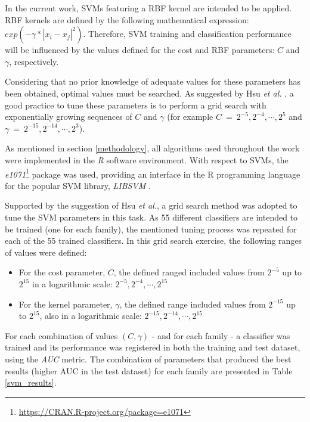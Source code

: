 \documentclass[11pt]{article}
\begin{document}
In the current work, SVMs featuring a RBF kernel are intended to be applied. RBF kernels are defined by the following mathematical expression: $exp(- \gamma * |x_{i}-x_{j}|^2) $. Therefore, SVM training and classification performance will be influenced by the values defined for the cost and RBF parameters: $C$ and $\gamma$, respectively.

Considering that no prior knowledge of adequate values for these parameters has been obtained, optimal values must be searched. As suggested by Hsu \emph{et al.} \cite{hsu2003practical}, a good practice to tune these parameters is to perform a grid search with exponentially growing sequences of $C$ and $\gamma$ (for example $C \: = \: 2^{-5}, 2^{-4}, \cdots , 2^{5}$ and $\gamma \: = \: 2^{-15}, 2^{-14}, \cdots , 2^{3}$).

As mentioned in section \ref{methodology}, all algorithms used throughout the work were implemented in the \emph{R} software environment. With respect to SVMs, the \emph{e1071}\footnote{\url{https://CRAN.R-project.org/package=e1071}} package was used, providing an interface in the R programming language for the popular SVM library, \emph{LIBSVM} \cite{CC01a}.

Supported by the suggestion of Hsu \emph{et al.}, a grid search method was adopted to tune the SVM parameters in this task. As 55 different classifiers are intended to be trained (one for each family), the mentioned tuning process was repeated for each of the 55 trained classifiers. In this grid search exercise, the following ranges of values were defined:

\begin{itemize}
	\item For the cost parameter, $C$, the defined ranged included values from $2^{-5}$ up to $2^{15}$ in a logarithmic scale: $2^{-5}, 2^{-4}, \cdots , 2^{15}$
	
	\item For the kernel parameter, $\gamma$, the defined range included values from $2^{-15}$ up to $2^{15}$, also in a logarithmic scale: $2^{-15}, 2^{-14}, \cdots , 2^{15}$
\end{itemize}

For each combination of values $(C, \gamma)$ - and for each family - a classifier was trained and its performance was registered in both the training and test dataset, using the \emph{AUC} metric. The combination of parameters that produced the best results (higher AUC in the test dataset) for each family are presented in Table \ref{svm_results}.
\end{document}
